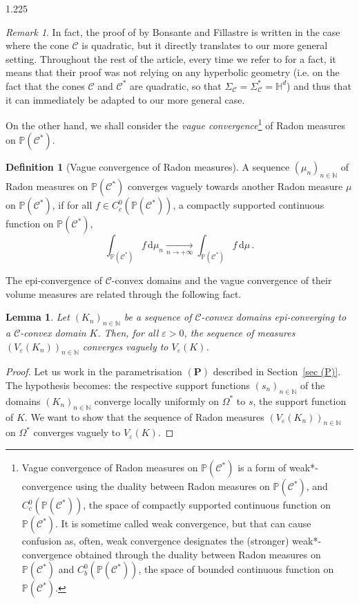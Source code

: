 \documentclass[reqno, a4paper]{amsart}
\numberwithin{equation}{section}
\numberwithin{figure}{section}
\newtheorem{lemma}[theorem]{Lemma}
\theoremstyle{definition}
\newtheorem{definition}[theorem]{Definition}
\theoremstyle{remark}
\newtheorem{remark}[theorem]{Remark}
\newcommand{\N}{\mathbb{N}} %
\renewcommand{\P}{\mathbb{P}} %
\renewcommand{\H}{\mathbb{H}} %
\newcommand{\dif}{\mathrm{d}} %
\newcommand{\C}{\mathcal{C}} %
\renewcommand{\S}{\Sigma_\C} %
\begin{document}
\begin{spacing}{1.225}
\begin{remark}
In fact, the proof of {\cite[Lemma~2.16]{Bonsante_Fillastre_17}} by Bonsante and Fillastre is written in the case where the cone $\C$ is quadratic, but it directly translates to our more general setting. Throughout the rest of the article, every time we refer to \cite{Bonsante_Fillastre_17} for a fact, it means that their proof was not relying on any hyperbolic geometry (i.e. on the fact that the cones $\C$ and $\C^*$ are quadratic, so that $\S = \S^*=\H^d$) and thus that it can immediately be adapted to our more general case. 
\end{remark}

On the other hand, we shall consider the \emph{vague convergence}\footnote{Vague convergence of Radon measures on $\P(\C^*)$ is a form of weak*-convergence using the duality between Radon measures on $\P(\C^*)$, and $C^0_c(\P(\C^*))$, the space of compactly supported continuous function on $\P(\C^*)$. It is sometime called weak convergence, but that can cause confusion as, often, weak convergence designates the (stronger) weak*-convergence obtained through the duality between Radon measures on $\P(\C^*)$ and $C^0_b(\P(\C^*))$, the space of bounded continuous function on $\P(\C^*)$. } 
of Radon measures on $\P(\C^*)$.

\begin{definition}[Vague convergence of Radon measures]
A sequence $(\mu_n)_{n\in \N}$ of Radon measures on $\P(\C^*)$ converges vaguely towards another Radon measure $\mu$ on $\P(\C^*)$, if for all $f \in C^0_c(\P(\C^*))$, a compactly supported continuous function on $\P(\C^*)$, 
\begin{equation*}
\int_{\P(\C^*)} f \,\dif \mu_n \xrightarrow[n\to +\infty]{} \int_{\P(\C^*)} f \,\dif \mu \, . 
\end{equation*}
\end{definition}

The epi-convergence of $\C$-convex domains and the vague convergence of their volume measures are related through the following fact. 

\begin{lemma}
\label{lem vague cv of Veps}
Let $(K_n)_{n\in\N}$ be a sequence of $\C$-convex domains epi-converging to a $\C$-convex domain $K$. Then, for all $\varepsilon>0$, the sequence of measures $(V_\varepsilon(K_n))_{n\in\N}$ converges vaguely to $V_\varepsilon(K)$. 
\end{lemma}
\begin{proof}
Let us work in the parametrisation $(\mathbf{P})$ described in Section~\ref{sec (P)}. The hypothesis becomes: the respective support functions $(s_n)_{n\in\N}$ of the domains $(K_n)_{n\in\N}$ converge locally uniformly on $\Omega^*$ to $s$, the support function of $K$. We want to show that the sequence of Radon measures $(V_\varepsilon(K_n))_{n\in\N}$ on $\Omega^*$ converges vaguely to $V_\varepsilon(K)$. 


\end{proof}
\end{spacing}
\end{document}
